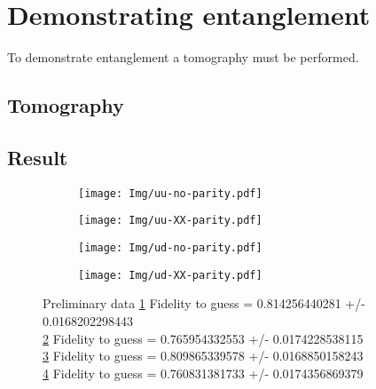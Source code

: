 \section{Demonstrating entanglement}
To demonstrate entanglement a tomography must be performed.


\subsection{Tomography}
\subsection{Result}
\begin{figure}[htbp]
    \begin{subfigure}[t]{0.49\textwidth}\centering
        \caption{}
        \texttt{[image: Img/uu-no-parity.pdf]}
        \label{fig:uu-init }
    \end{subfigure}
    \begin{subfigure}[t]{0.49\textwidth}\centering
        \caption{}
        \texttt{[image: Img/uu-XX-parity.pdf]}
        \label{fig:uu-XX}
    \end{subfigure}

    \begin{subfigure}[t]{0.49\textwidth}\centering
        \caption{}
        \texttt{[image: Img/ud-no-parity.pdf]}
        \label{fig:ud-init }
    \end{subfigure}
    \begin{subfigure}[t]{0.49\textwidth}\centering
        \caption{}
        \texttt{[image: Img/ud-XX-parity.pdf]}
        \label{fig:ud-XX}
    \end{subfigure}
    \caption{ Preliminary data
    \cref{fig:uu-init } Fidelity to guess  = 0.814256440281 +/- 0.0168202298443\\
    \cref{fig:uu-XX}  Fidelity to guess  = 0.765954332553 +/- 0.0174228538115\\
    \cref{fig:ud-init } Fidelity to guess  = 0.809865339578 +/- 0.0168850158243\\
    \cref{fig:ud-XX}  Fidelity to guess  = 0.760831381733 +/- 0.0174356869379
    }
    \label{fig:2qubitTomos}
\end{figure}


%





